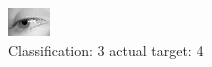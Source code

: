 \begin{figure}[h!]
\begin{center}
\includegraphics[width=0.60\columnwidth]{figures/ID3021_class_3_target_4.png}
\end{center}
\caption{ Classification: 3 actual target: 4}
\label{fig:ID3021_class_3_target_4}
\end{figure}
